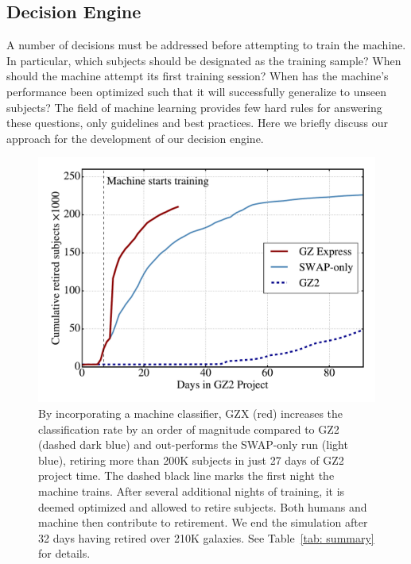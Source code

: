 \subsection{Decision Engine}\label{sec: decision engine}
A number of decisions must be addressed before attempting to train the machine. 
In particular, which subjects should be designated as the training sample? 
When should the machine attempt its first training session? 
When has the machine's performance been optimized such that it will successfully
generalize to unseen subjects? The field of machine learning provides few hard rules 
for answering these questions, only guidelines and best practices. 
Here we briefly discuss our approach for the development of our decision engine.

\begin{figure}[t!]
\centering
\includegraphics[width=5.5in]{Figures/human_machine/f7.pdf}
\caption[Performance of the human+machine combination -- Galaxy Zoo: Express]{By incorporating a machine classifier, GZX (red) increases the classification rate by an order of magnitude compared to GZ2 (dashed dark blue) and out-performs the SWAP-only run (light blue), retiring more than 200K subjects in just 27 days of GZ2 project time. The dashed black line marks the first night the machine trains. After several additional nights of training, it is deemed optimized and allowed to retire subjects. Both humans and machine then contribute to retirement. We end the simulation after 32 days having retired over 210K galaxies. See Table~\ref{tab: summary} for details. \label{fig: money}}
\end{figure}


